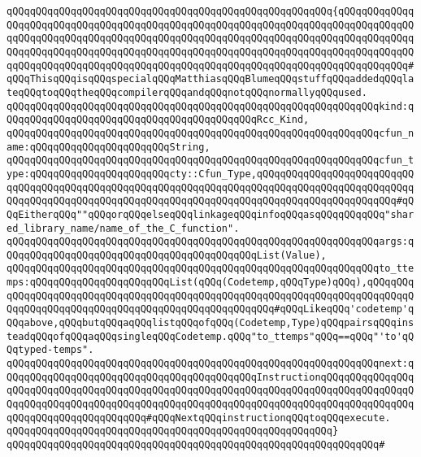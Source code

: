 \verb|qQQqqQQqqQQqqQQqqQQqqQQqqQQqqQQqqQQqqQQqqQQqqQQqqQQqqQQq{qQQqqQQqqQQqqQQqqQQqqQQqqQQqqQQqqQQqqQQqqQQqqQQqqQQqqQQqqQQqqQQqqQQqqQQqqQQqqQQqqQQqqQQqqQQqqQQqqQQqqQQqqQQqqQQqqQQqqQQqqQQqqQQqqQQqqQQqqQQqqQQqqQQqqQQqqQQqqQQqqQQqqQQqqQQqqQQqqQQqqQQqqQQqqQQqqQQqqQQqqQQqqQQqqQQqqQQqqQQqqQQqqQQqqQQqqQQqqQQqqQQqqQQqqQQqqQQqqQQqqQQqqQQqqQQqqQQqqQQqqQQqqQQqqQQq#qQQqThisqQQqisqQQqspecialqQQqMatthiasqQQqBlumeqQQqstuffqQQqaddedqQQqlateqQQqtoqQQqtheqQQqcompilerqQQqandqQQqnotqQQqnormallyqQQqused.|\newline
\verb|qQQqqQQqqQQqqQQqqQQqqQQqqQQqqQQqqQQqqQQqqQQqqQQqqQQqqQQqqQQqqQQqkind:qQQqqQQqqQQqqQQqqQQqqQQqqQQqqQQqqQQqqQQqqQQqRcc_Kind,|\newline
\verb|qQQqqQQqqQQqqQQqqQQqqQQqqQQqqQQqqQQqqQQqqQQqqQQqqQQqqQQqqQQqqQQqcfun_name:qQQqqQQqqQQqqQQqqQQqqQQqString,|\newline
\verb|qQQqqQQqqQQqqQQqqQQqqQQqqQQqqQQqqQQqqQQqqQQqqQQqqQQqqQQqqQQqqQQqcfun_type:qQQqqQQqqQQqqQQqqQQqqQQqcty::Cfun_Type,qQQqqQQqqQQqqQQqqQQqqQQqqQQqqQQqqQQqqQQqqQQqqQQqqQQqqQQqqQQqqQQqqQQqqQQqqQQqqQQqqQQqqQQqqQQqqQQqqQQqqQQqqQQqqQQqqQQqqQQqqQQqqQQqqQQqqQQqqQQqqQQqqQQqqQQqqQQqqQQqqQQq#qQQqEitherqQQq""qQQqorqQQqelseqQQqlinkageqQQqinfoqQQqasqQQqqQQqqQQq"shared_library_name/name_of_the_C_function".|\newline
\verb|qQQqqQQqqQQqqQQqqQQqqQQqqQQqqQQqqQQqqQQqqQQqqQQqqQQqqQQqqQQqqQQqargs:qQQqqQQqqQQqqQQqqQQqqQQqqQQqqQQqqQQqqQQqqQQqList(Value),|\newline
\verb|qQQqqQQqqQQqqQQqqQQqqQQqqQQqqQQqqQQqqQQqqQQqqQQqqQQqqQQqqQQqqQQqto_ttemps:qQQqqQQqqQQqqQQqqQQqqQQqList(qQQq(Codetemp,qQQqType)qQQq),qQQqqQQqqQQqqQQqqQQqqQQqqQQqqQQqqQQqqQQqqQQqqQQqqQQqqQQqqQQqqQQqqQQqqQQqqQQqqQQqqQQqqQQqqQQqqQQqqQQqqQQqqQQqqQQqqQQqqQQqqQQq#qQQqLikeqQQq'codetemp'qQQqabove,qQQqbutqQQqaqQQqlistqQQqofqQQq(Codetemp,Type)qQQqpairsqQQqinsteadqQQqofqQQqaqQQqsingleqQQqCodetemp.qQQq"to_ttemps"qQQq==qQQq"'to'qQQqtyped-temps".|\newline
\verb|qQQqqQQqqQQqqQQqqQQqqQQqqQQqqQQqqQQqqQQqqQQqqQQqqQQqqQQqqQQqqQQqnext:qQQqqQQqqQQqqQQqqQQqqQQqqQQqqQQqqQQqqQQqqQQqInstructionqQQqqQQqqQQqqQQqqQQqqQQqqQQqqQQqqQQqqQQqqQQqqQQqqQQqqQQqqQQqqQQqqQQqqQQqqQQqqQQqqQQqqQQqqQQqqQQqqQQqqQQqqQQqqQQqqQQqqQQqqQQqqQQqqQQqqQQqqQQqqQQqqQQqqQQqqQQqqQQqqQQqqQQqqQQqqQQqqQQq#qQQqNextqQQqinstructionqQQqtoqQQqexecute.|\newline
\verb|qQQqqQQqqQQqqQQqqQQqqQQqqQQqqQQqqQQqqQQqqQQqqQQqqQQqqQQq}|\newline
\verb|qQQqqQQqqQQqqQQqqQQqqQQqqQQqqQQqqQQqqQQqqQQqqQQqqQQqqQQqqQQqqQQq#|\newline
